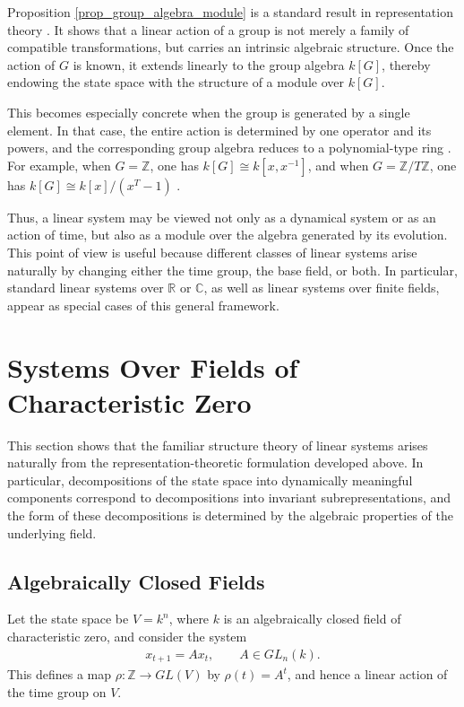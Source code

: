 \documentclass[letterpaper, 9pt, conference]{ieeeconf}
\begin{document}
Proposition \ref{prop_group_algebra_module} is a standard result in representation
theory \cite{dummit_foote}. It shows that a linear action of a group is not
merely a family of compatible transformations, but carries an intrinsic algebraic
structure. Once the action of $G$ is known, it extends linearly to the group
algebra $k[G]$, thereby endowing the state space with the structure of a module
over $k[G]$.

This becomes especially concrete when the group is generated by a single
element. In that case, the entire action is determined by one operator and its
powers, and the corresponding group algebra reduces to a polynomial-type ring
\cite{lang_algebra_book,dummit_foote}. For example, when $G = \mathbb{Z}$, one
has $k[G] \cong k[x,x^{-1}]$, and when $G = \mathbb{Z}/T\mathbb{Z}$, one has
$k[G] \cong k[x]/(x^T - 1)$
\cite{lang_algebra_book,dummit_foote}.

Thus, a linear system may be viewed not only as a dynamical system or as an
action of time, but also as a module over the algebra generated by its
evolution. This point of view is useful because different classes of linear
systems arise naturally by changing either the time group, the base field, or
both. In particular, standard linear systems over $\mathbb{R}$ or $\mathbb{C}$,
as well as linear systems over finite fields, appear as special cases of this
general framework.





\section{Systems Over Fields of Characteristic Zero}\label{sec_char_zero}

This section shows that the familiar structure theory of linear systems arises
naturally from the representation-theoretic formulation developed above. In
particular, decompositions of the state space into dynamically meaningful
components correspond to decompositions into invariant subrepresentations, and
the form of these decompositions is determined by the algebraic properties of
the underlying field.

\subsection{Algebraically Closed Fields}

Let the state space be $V = k^n$, where $k$ is an algebraically closed field
of characteristic zero, and consider the system
\begin{eqnarray}
x_{t+1} = A x_t, \qquad A \in GL_n(k).
\end{eqnarray}
This defines a map $\rho : \mathbb{Z} \to GL(V)$ by $\rho(t) = A^t$, and hence
a linear action of the time group on $V$.
\end{document}
